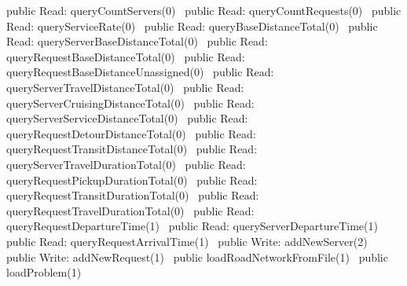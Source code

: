 public \LA{}Read: queryCountServers(0)~{\nwtagstyle{}}\RA{}
public \LA{}Read: queryCountRequests(0)~{\nwtagstyle{}}\RA{}
public \LA{}Read: queryServiceRate(0)~{\nwtagstyle{}}\RA{}
public \LA{}Read: queryBaseDistanceTotal(0)~{\nwtagstyle{}}\RA{}
public \LA{}Read: queryServerBaseDistanceTotal(0)~{\nwtagstyle{}}\RA{}
public \LA{}Read: queryRequestBaseDistanceTotal(0)~{\nwtagstyle{}}\RA{}
public \LA{}Read: queryRequestBaseDistanceUnassigned(0)~{\nwtagstyle{}}\RA{}
public \LA{}Read: queryServerTravelDistanceTotal(0)~{\nwtagstyle{}}\RA{}
public \LA{}Read: queryServerCruisingDistanceTotal(0)~{\nwtagstyle{}}\RA{}
public \LA{}Read: queryServerServiceDistanceTotal(0)~{\nwtagstyle{}}\RA{}
public \LA{}Read: queryRequestDetourDistanceTotal(0)~{\nwtagstyle{}}\RA{}
public \LA{}Read: queryRequestTransitDistanceTotal(0)~{\nwtagstyle{}}\RA{}
public \LA{}Read: queryServerTravelDurationTotal(0)~{\nwtagstyle{}}\RA{}
public \LA{}Read: queryRequestPickupDurationTotal(0)~{\nwtagstyle{}}\RA{}
public \LA{}Read: queryRequestTransitDurationTotal(0)~{\nwtagstyle{}}\RA{}
public \LA{}Read: queryRequestTravelDurationTotal(0)~{\nwtagstyle{}}\RA{}
public \LA{}Read: queryRequestDepartureTime(1)~{\nwtagstyle{}}\RA{}
public \LA{}Read: queryServerDepartureTime(1)~{\nwtagstyle{}}\RA{}
public \LA{}Read: queryRequestArrivalTime(1)~{\nwtagstyle{}}\RA{}
\nwendcode{}\nwdocspar
{}
\nwenddocs{}\plusendmoddef
public \LA{}Write: addNewServer(2)~{\nwtagstyle{}}\RA{}
public \LA{}Write: addNewRequest(1)~{\nwtagstyle{}}\RA{}
public \LA{}loadRoadNetworkFromFile(1)~{\nwtagstyle{}}\RA{}
public \LA{}loadProblem(1)~{\nwtagstyle{}}\RA{}
\nwendcode{}\nwdocspar
{}
\nwenddocs{}\plusendmoddef
